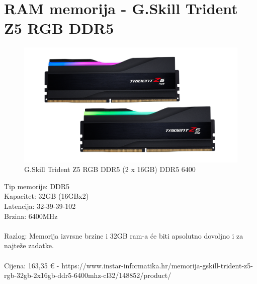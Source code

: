 \documentclass{report}
\begin{document}
\pagebreak

\section{RAM memorija - G.Skill Trident Z5 RGB DDR5}
\begin{figure}[H]
    \centering
    \includegraphics[scale=0.17]{Slike/gskillram.png}
    \caption{G.Skill Trident Z5 RGB DDR5 (2 x 16GB) DDR5 6400}
    \label{fig:ram}
\end{figure}
Tip memorije: DDR5\\Kapacitet: 32GB (16GBx2)\\Latencija: 32-39-39-102\\Brzina: 6400MHz\\\\Razlog: Memorija izvrsne brzine i 32GB ram-a će biti apsolutno dovoljno i za najteže zadatke.\\\\Cijena: 163,35 € - https://www.instar-informatika.hr/memorija-gskill-trident-z5-rgb-32gb-2x16gb-ddr5-6400mhz-cl32/148852/product/

\pagebreak
\end{document}
